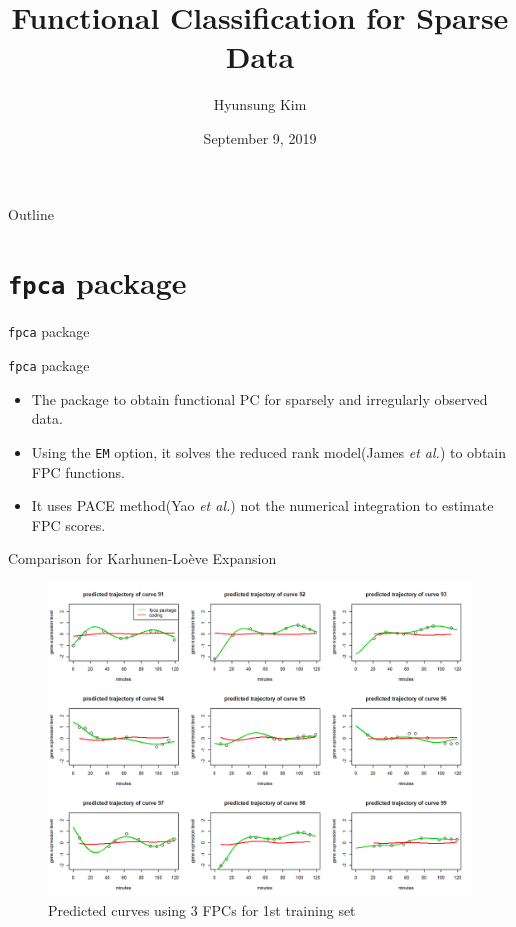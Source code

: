 \documentclass{beamer}
\title{Functional Classification for Sparse Data}
\date[Short Occasion]{September 9, 2019}
\author{Hyunsung Kim}
\institute{Department of Statistics\\ Chung-Ang University}
\subtitle{}
\begin{document}
\begin{frame}
  \titlepage
\end{frame}

\begin{frame}{Outline}
  \tableofcontents
\end{frame}

\section{\texttt{fpca} package}
\begin{frame}{\texttt{fpca} package}
	\begin{block}{\texttt{fpca} package}
		\vspace{0.1cm}
		\begin{itemize}
			\item {
				The package to obtain functional PC for sparsely and irregularly observed data.
			}
			\item {
				Using the \texttt{EM} option, it solves the reduced rank model(James \textit{et al.}) to obtain FPC functions.
			}		
			\item {
				It uses PACE method(Yao \textit{et al.}) not the numerical integration to estimate FPC scores.
			}
		\end{itemize}
	\end{block}
\end{frame}

\begin{frame}{Comparison for Karhunen-Lo\`{e}ve Expansion}
	\begin{figure}[h] %
		\begin{center}
			\includegraphics[width=0.8\linewidth]{img/1.png}
		\end{center}
		\label{fig:long}
		\label{fig:onecol}
		\caption{Predicted curves using 3 FPCs for 1st training set}
	\end{figure}
\end{frame}
\end{document}

